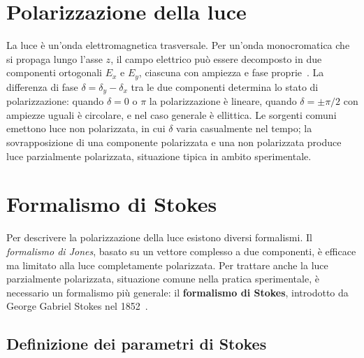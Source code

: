
{\color{black}
\section{Polarizzazione della luce}
\label{sec:polarizzazione}
La luce è un'onda elettromagnetica trasversale. Per un'onda monocromatica che si propaga lungo l'asse $z$, il campo elettrico può essere decomposto in due componenti ortogonali $E_x$ e $E_y$, ciascuna con ampiezza e fase proprie~\cite{hecht2017optics}. La differenza di fase $\delta = \delta_y - \delta_x$ tra le due componenti determina lo stato di polarizzazione: quando $\delta = 0$ o $\pi$ la polarizzazione è lineare, quando $\delta = \pm\pi/2$ con ampiezze uguali è circolare, e nel caso generale è ellittica. Le sorgenti comuni emettono luce non polarizzata, in cui $\delta$ varia casualmente nel tempo; la sovrapposizione di una componente polarizzata e una non polarizzata produce luce parzialmente polarizzata, situazione tipica in ambito sperimentale.
\par}


\section{Formalismo di Stokes}
\label{sec:stokes}

Per descrivere la polarizzazione della luce esistono diversi formalismi. Il \emph{formalismo di Jones}, basato su un vettore complesso a due componenti, è efficace ma limitato alla luce completamente polarizzata. Per trattare anche la luce parzialmente polarizzata, situazione comune nella pratica sperimentale, è necessario un formalismo più generale: il \textbf{formalismo di Stokes}, introdotto da George Gabriel Stokes nel 1852~\cite{goldstein2011polarized}.

\subsection{Definizione dei parametri di Stokes}
\label{subsec:stokes_def}

